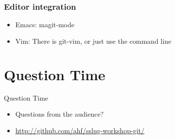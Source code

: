 \documentclass[xcolor=pdftex,dvipsnames]{beamer}
\begin{document}
\begin{frame}
  \frametitle{Editor integration}
  \begin{itemize}
  \item Emacs: magit-mode
  \item Vim: There is git-vim, or just use the command line
  \end{itemize}
\end{frame}


\section{Question Time}
\begin{frame}{Question Time}
    \begin{itemize}
        \item Questions from the audience?
        \item \url{http://github.com/ahf/sslug-workshop-git/}
    \end{itemize}
\end{frame}
\end{document}
